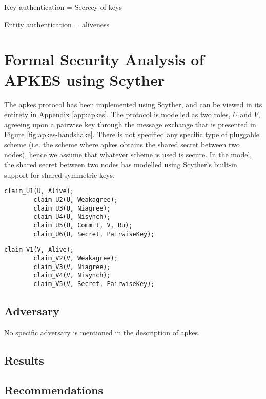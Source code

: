 Key authentication = Secrecy of keys

Entity authentication = aliveness


\section{Formal Security Analysis of APKES using Scyther}

The \gls{apkes} protocol has been implemented using Scyther, and can be viewed in its entirety in Appendix \ref{app:apkes}. The protocol is modelled as two roles, $U$ and $V$, agreeing upon a pairwise key through the message exchange that is presented in Figure \ref{fig:apkes-handshake}. There is not specified any specific type of pluggable scheme (i.e. the scheme where \gls{apkes} obtains the shared secret between two nodes), hence we assume that whatever scheme is used is secure. In the model, the shared secret between two nodes has modelled using Scyther's built-in support for shared symmetric keys.


\begin{lstlisting}[caption={Security claims for role U in APKES.}, label={lst:claims-u-apkes}]
		claim_U1(U, Alive);
		claim_U2(U, Weakagree);
		claim_U3(U, Niagree);
		claim_U4(U, Nisynch);
		claim_U5(U, Commit, V, Ru);
		claim_U6(U, Secret, PairwiseKey);
\end{lstlisting}

\begin{lstlisting}[caption={Security claims for role V in APKES.}, label={lst:claims-v-apkes}]
		claim_V1(V, Alive);
		claim_V2(V, Weakagree);
		claim_V3(V, Niagree);
		claim_V4(V, Nisynch);
		claim_V5(V, Secret, PairwiseKey);
\end{lstlisting}


\subsection{Adversary}

No specific adversary is mentioned in the description of \gls{apkes}. 



\subsection{Results}

\subsection{Recommendations}



